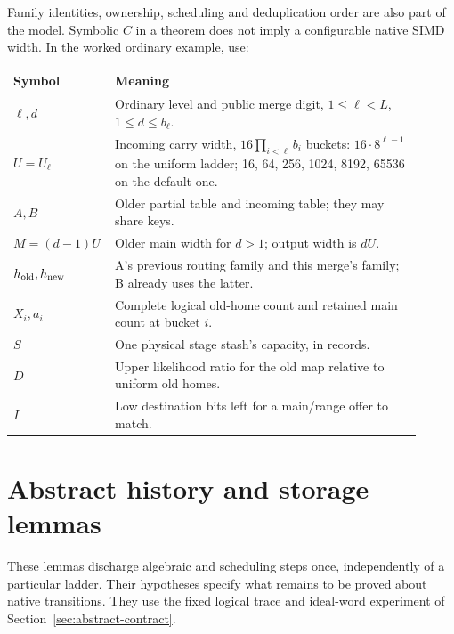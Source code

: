 \documentclass[11pt]{article}
\theoremstyle{definition}
\theoremstyle{remark}
\begin{document}
Family identities, ownership, scheduling and deduplication order are also
part of the model. Symbolic $C$ in a theorem does not imply a configurable
native SIMD width. In the worked ordinary example, use:
\begin{center}\small
\begin{tabular}{p{0.18\linewidth}p{0.73\linewidth}}
\toprule
Symbol & Meaning\\
\midrule
$\ell,d$ & Ordinary level and public merge digit, $1\le\ell<L$, $1\le d\le b_\ell$.\\
$U=U_\ell$ & Incoming carry width, $16\prod_{i<\ell}b_i$ buckets: $16\cdot8^{\ell-1}$
on the uniform ladder; 16, 64, 256, 1024, 8192, 65536 on the default one.\\
$A,B$ & Older partial table and incoming table; they may share keys.\\
$M=(d-1)U$ & Older main width for $d>1$; output width is $dU$.\\
$h_{\rm old},h_{\rm new}$ & A's previous routing family and this merge's family; B already uses the latter.\\
$X_i,a_i$ & Complete logical old-home count and retained main count at bucket $i$.\\
$S$ & One physical stage stash's capacity, in records.\\
$D$ & Upper likelihood ratio for the old map relative to uniform old homes.\\
$I$ & Low destination bits left for a main/range offer to match.\\
\bottomrule
\end{tabular}
\end{center}

\section{Abstract history and storage lemmas}
\label{sec:abstract-history}
These lemmas discharge algebraic and scheduling steps once, independently
of a particular ladder. Their hypotheses specify what remains to be proved
about native transitions. They use the fixed logical trace and ideal-word
experiment of Section~\ref{sec:abstract-contract}.
\end{document}

